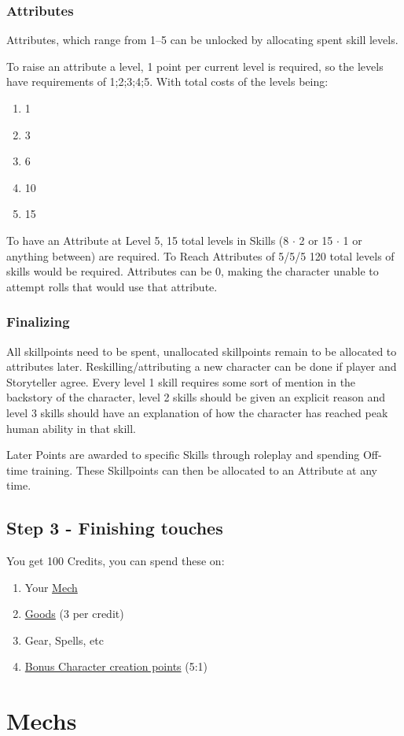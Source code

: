 \documentclass[a4paper]{book}
\begin{document}
    \subsection{Attributes}\label{subsec:attributes}
    Attributes, which range from 1--5 can be unlocked by allocating spent skill levels.\par
    To raise an attribute a level, 1 point per current level is required, so the levels have requirements of 1;2;3;4;5.
    With total costs of the levels being:\par
    \begin{enumerate}
        \item 1
        \item 3
        \item 6
        \item 10
        \item 15
    \end{enumerate}
    To have an Attribute at Level 5, 15 total levels in Skills (8 $\cdot$ 2 or 15 $\cdot$ 1 or anything between) are
    required.
    To Reach Attributes of 5/5/5 120 total levels of skills would be required.
    Attributes can be 0, making the character unable to attempt rolls that would use that attribute.

    \subsection{Finalizing}\label{subsec:finalizing}
    All skillpoints need to be spent, unallocated skillpoints remain to be allocated to attributes later.
    Reskilling/attributing a new character can be done if player and Storyteller agree.
    Every level 1 skill requires some sort of mention in the backstory of the character, level 2 skills should be given
    an explicit reason and level 3 skills should have an explanation of how the character has reached peak human ability
    in that skill.

    Later Points are awarded to specific Skills through roleplay and spending Off-time training.
    These Skillpoints can then be allocated to an Attribute at any time.

    \section{Step 3 - Finishing touches}\label{sec:step3-finishingtouches}
    You get 100 Credits, you can spend these on:
    \begin{enumerate}[label = -]
        \item Your \hyperref[ch:mechs]{Mech}
        \item \hyperref[sec:tradegoods]{Goods} (3 per credit)
        \item Gear, Spells, etc
        \item \hyperref[sec:step2-scores]{Bonus Character creation points} (5:1)
    \end{enumerate}

    \chapter{Mechs}\label{ch:mechs}
    
\end{document}
